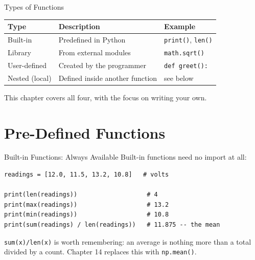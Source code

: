 \documentclass[9pt,aspectratio=169,xcolor=table]{beamer}
\newcommand{\striped}{\rowcolors{1}{white}{stripe}}
\begin{document}
\begin{frame}{Types of Functions}
    \leavevmode
    \small
    \striped
    \begin{center}
    \begin{tabular}{p{2.6cm}p{4.3cm}p{3.3cm}}
        \toprule
        \textbf{Type} & \textbf{Description} & \textbf{Example} \\
        \midrule
        Built-in & Predefined in Python & \texttt{print()}, \texttt{len()} \\
        Library & From external modules & \texttt{math.sqrt()} \\
        User-defined & Created by the programmer & \texttt{def greet():} \\
        Nested (local) & Defined inside another function & see below \\
        \bottomrule
    \end{tabular}
    \end{center}

    \vspace{3mm}
    {\small This chapter covers all four, with the focus on
    \alert{writing your own}.}
\end{frame}

\section{Pre-Defined Functions}

\begin{frame}[fragile]{Built-in Functions: Always Available}
    \leavevmode
    Built-in functions need \alert{no import} at all:

\begin{lstlisting}
readings = [12.0, 11.5, 13.2, 10.8]   # volts

print(len(readings))                   # 4
print(max(readings))                   # 13.2
print(min(readings))                   # 10.8
print(sum(readings) / len(readings))   # 11.875 -- the mean
\end{lstlisting}

    \vspace{1mm}
    {\small \texttt{sum(x)/len(x)} is worth remembering: an average is
    nothing more than a total divided by a count. Chapter 14 replaces
    this with \texttt{np.mean()}.}
\end{frame}
\end{document}
